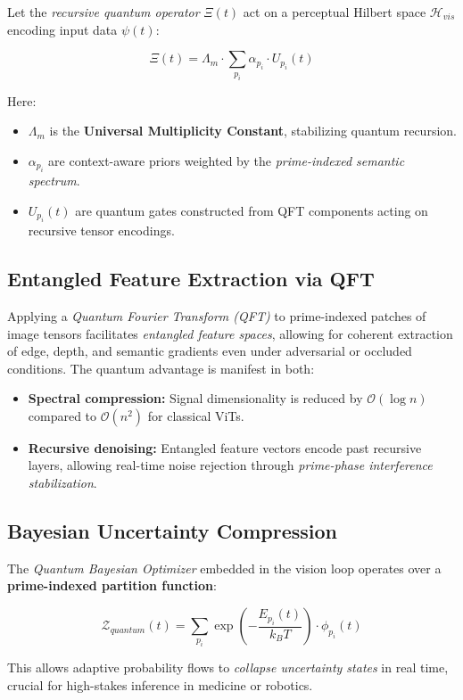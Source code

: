 \documentclass[12pt]{article}
\theoremstyle{plain}
\begin{document}
Let the \textit{recursive quantum operator} $\Xi(t)$ act on a perceptual Hilbert space $\mathcal{H}_{vis}$ encoding input data $\psi(t)$:

\[
\Xi(t) = \Lambda_m \cdot \sum_{p_i} \alpha_{p_i} \cdot U_{p_i}(t)
\]

Here:
\begin{itemize}
    \item $\Lambda_m$ is the \textbf{Universal Multiplicity Constant}, stabilizing quantum recursion.
    \item $\alpha_{p_i}$ are context-aware priors weighted by the \textit{prime-indexed semantic spectrum}.
    \item $U_{p_i}(t)$ are quantum gates constructed from QFT components acting on recursive tensor encodings.
\end{itemize}

\subsection*{Entangled Feature Extraction via QFT}

Applying a \textit{Quantum Fourier Transform (QFT)} to prime-indexed patches of image tensors facilitates \textit{entangled feature spaces}, allowing for coherent extraction of edge, depth, and semantic gradients even under adversarial or occluded conditions. The quantum advantage is manifest in both:
\begin{itemize}
    \item \textbf{Spectral compression:} Signal dimensionality is reduced by $\mathcal{O}(\log n)$ compared to $\mathcal{O}(n^2)$ for classical ViTs.
    \item \textbf{Recursive denoising:} Entangled feature vectors encode past recursive layers, allowing real-time noise rejection through \textit{prime-phase interference stabilization}.
\end{itemize}

\subsection*{Bayesian Uncertainty Compression}

The \textit{Quantum Bayesian Optimizer} embedded in the vision loop operates over a \textbf{prime-indexed partition function}:

\[
\mathcal{Z}_{quantum}(t) = \sum_{p_i} \exp\left(-\frac{E_{p_i}(t)}{k_B T}\right) \cdot \phi_{p_i}(t)
\]

This allows adaptive probability flows to \textit{collapse uncertainty states} in real time, crucial for high-stakes inference in medicine or robotics.
\end{document}
